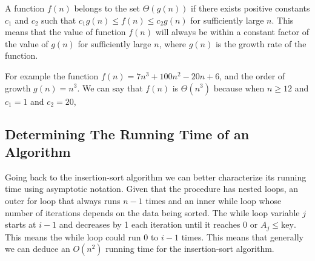 \documentclass[12pt letter]{report}
\begin{document}

A function $f \left( n \right) $ belongs to the set $\Theta \left( g \left( n \right)  \right) $ if there exists positive
constants $c_1$ and $c_2$ such that $c_1 g \left( n \right) \leq f \left( n \right) \leq c_2 g \left( n \right)  $ for
sufficiently large $n$. This means that the value of function $f \left( n \right) $ will always be within a constant factor
of the value of $g \left( n \right) $ for sufficiently large $n$, where $g \left( n \right) $ is the growth rate of the function.

For example the function $f \left( n \right) = 7n^3 + 100n^2 - 20n + 6 $, and the order of growth $g \left( n \right) = n^3 $.
We can say that $f \left( n \right) $ is $\Theta \left( n^3 \right) $ because when $n \geq 12$ and $c_1 = 1$ and $c_2 = 20$,


\subsection{Determining The Running Time of an Algorithm}

Going back to the insertion-sort algorithm we can better characterize its running time using asymptotic notation. Given
that the procedure has nested loops, an outer for loop that always runs $n-1$ times and an inner while loop whose number
of iterations depends on the data being sorted. The while loop variable $j$ starts at $i - 1$ and decreases by 1 each
iteration until it reaches 0 or $A_j \leq \text{key}$. This means the while loop could run $0$ to $i-1$ times. This
means that generally we can deduce an $O \left( n^2 \right) $ running time for the insertion-sort algorithm.
\end{document}

